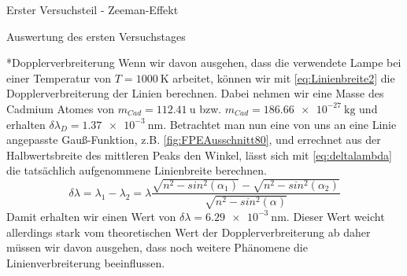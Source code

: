 \documentclass[pdftex, a4paper,11pt, twoside, ngerman]{report}
\begin{document}
\begin{chapter}{Erster Versuchsteil - Zeeman-Effekt}
\begin{section}{Auswertung des ersten Versuchstages}
\begin{subsection}
        \begin{subsubsection}*{Dopplerverbreiterung}
          Wenn wir davon ausgehen, dass die verwendete Lampe bei einer
          Temperatur von $T=\SI{1000}{\kelvin}$ arbeitet, können wir mit
          \cref{eq:Linienbreite2} die Dopplerverbreiterung der Linien berechnen.
          Dabei nehmen wir eine Masse des Cadmium Atomes von
          $m_{Cad}=\SI{112.41}{\atomicmassunit}$ bzw.
          $m_{Cad}=\SI{186.66e-27}{\kilo\gram}$ und erhalten
          $\delta\lambda_{D}=\SI{1.37e-3}{\nano\meter}$. \newline
          Betrachtet man nun eine von uns an eine Linie angepasste
          Gauß-Funktion, z.B. \cref{fig:FPEAusschnitt80}, und errechnet aus der
          Halbwertsbreite des mittleren Peaks den Winkel, lässt sich mit
          \cref{eq:deltalambda} die tatsächlich aufgenommene Linienbreite
          berechnen.
          \begin{equation}
            \label{eq:deltalambda}
            \delta\lambda = \lambda_{1}-\lambda_{2} = \lambda
            \frac{\sqrt{n^{2}-sin^{2}(\alpha_{1})}-\sqrt{n^{2}-sin^{2}
            (\alpha_{2})}}{\sqrt{n^{2}-sin^{2}(\alpha)}}
          \end{equation}
          \newline
          Damit erhalten wir einen Wert von 
          $\delta\lambda=\SI{6.29e-3}{\nano\meter}$. Dieser Wert weicht
          allerdings stark vom theoretischen Wert der Dopplerverbreiterung ab
          daher müssen wir davon ausgehen, dass noch weitere Phänomene die
          Linienverbreiterung beeinflussen.
          
        \end{subsubsection}
        
      \end{subsection}
      
    \end{section}
   
   
   

\end{chapter}
\end{document}
